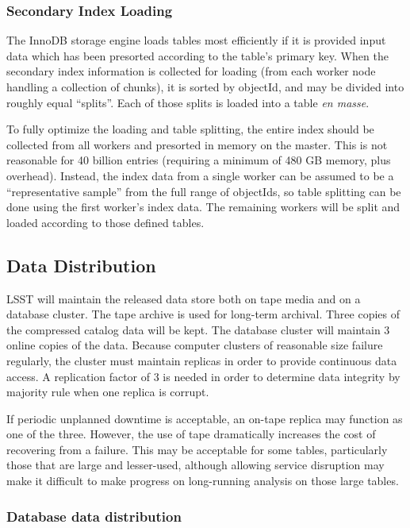 \documentclass[DM,lsstdraft,toc]{lsstdoc}
\begin{document}
\subsubsection{Secondary Index Loading}\label{secondary-index-loading}

The InnoDB storage engine loads tables most efficiently if it is
provided input data which has been presorted according to the table's
primary key. When the secondary index information is collected for
loading (from each worker node handling a collection of chunks), it is
sorted by objectId, and may be divided into roughly equal ``splits''.
Each of those splits is loaded into a table \emph{en masse}.

To fully optimize the loading and table splitting, the entire index
should be collected from all workers and presorted in memory on the
master. This is not reasonable for 40 billion entries (requiring a minimum
of 480 GB memory, plus overhead). Instead, the index data from a single
worker can be assumed to be a ``representative sample'' from the full
range of objectIds, so table splitting can be done using the first
worker's index data. The remaining workers will be split and loaded
according to those defined tables.

\subsection{Data Distribution}\label{data-distribution}

LSST will maintain the released data store both on tape media and on a
database cluster. The tape archive is used for long-term archival. Three
copies of the compressed catalog data will be kept. The database cluster will
maintain 3 online copies of the data. Because computer clusters of reasonable
size failure regularly, the cluster must maintain replicas in order to provide
continuous data access. A replication factor of 3 is needed in order to
determine data integrity by majority rule when one replica is corrupt.

If periodic unplanned downtime is acceptable, an on-tape replica may
function as one of the three. However, the use of tape dramatically
increases the cost of recovering from a failure. This may be acceptable
for some tables, particularly those that are large and lesser-used,
although allowing service disruption may make it difficult to make
progress on long-running analysis on those large tables.

\subsubsection{Database data
distribution}\label{database-data-distribution}
\end{document}
